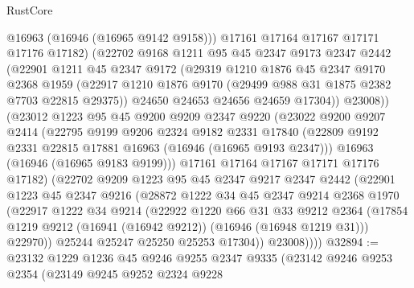 \begin{lexlean}{RustCore}
\begin{coremodule}
              @16963
              (@16946 (@16965 @9142 @9158)))
            @17161
            @17164
            @17167
            @17171
            @17176
            @17182)
          (@22702
            @9168
            @1211
            @95
            @45
            @2347
            @9173
            @2347
            @2442
            (@22901
              @1211
              @45
              @2347
              @9172
              (@29319
                @1210
                @1876
                @45
                @2347
                @9170
                @2368
                @1959
                (@22917 @1210 @1876 @9170 (@29499 @988 @31 @1875 @2382 @7703 @22815 @29375))
                @24650
                @24653
                @24656
                @24659
                @17304))
            @23008))
        (@23012
          @1223
          @95
          @45
          @9200
          @9209
          @2347
          @9220
          (@23022
            @9200
            @9207
            @2414
            (@22795
              @9199
              @9206
              @2324
              @9182
              @2331
              @17840
              (@22809 @9192 @2331 @22815 @17881 @16963 (@16946 (@16965 @9193 @2347)))
              @16963
              (@16946 (@16965 @9183 @9199)))
            @17161
            @17164
            @17167
            @17171
            @17176
            @17182)
          (@22702
            @9209
            @1223
            @95
            @45
            @2347
            @9217
            @2347
            @2442
            (@22901
              @1223
              @45
              @2347
              @9216
              (@28872
                @1222
                @34
                @45
                @2347
                @9214
                @2368
                @1970
                (@22917
                  @1222
                  @34
                  @9214
                  (@22922
                    @1220
                    @66
                    @31
                    @33
                    @9212
                    @2364
                    (@17854 @1219 @9212 (@16941 (@16942 @9212)) (@16946 (@16948 @1219 @31)))
                    @22970))
                @25244
                @25247
                @25250
                @25253
                @17304))
            @23008))))
@32894 := @23132
    @1229
    @1236
    @45
    @9246
    @9255
    @2347
    @9335
    (@23142
      @9246
      @9253
      @2354
      (@23149
        @9245
        @9252
        @2324
        @9228

\end{coremodule}
\end{lexlean}
